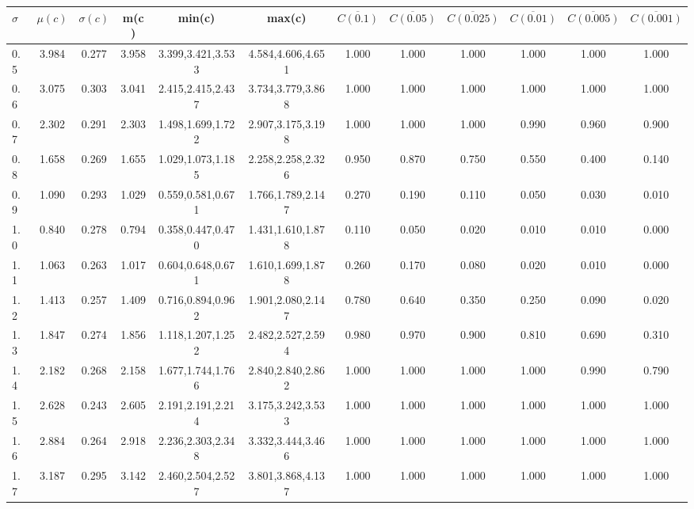 \begin{table*}[h!]
\begin{center}
\begin{tabular}{| l | c | c | c | c | c | c | c | c | c | c | c |}\hline
$\sigma$ & $\mu(c)$ & $\sigma(c)$ & m(c) & min(c) & max(c) & $\overline{C(0.1)}$ & $\overline{C(0.05)}$ & $\overline{C(0.025)}$ & $\overline{C(0.01)}$ & $\overline{C(0.005)}$ & $\overline{C(0.001)}$ \\\hline
0.5 & 3.984 & 0.277 & 3.958 & 3.399,3.421,3.533 & 4.584,4.606,4.651  & 1.000  & 1.000  & 1.000  & 1.000  & 1.000  & 1.000 \\\hline
0.6 & 3.075 & 0.303 & 3.041 & 2.415,2.415,2.437 & 3.734,3.779,3.868  & 1.000  & 1.000  & 1.000  & 1.000  & 1.000  & 1.000 \\\hline
0.7 & 2.302 & 0.291 & 2.303 & 1.498,1.699,1.722 & 2.907,3.175,3.198  & 1.000  & 1.000  & 1.000  & 0.990  & 0.960  & 0.900 \\\hline
0.8 & 1.658 & 0.269 & 1.655 & 1.029,1.073,1.185 & 2.258,2.258,2.326  & 0.950  & 0.870  & 0.750  & 0.550  & 0.400  & 0.140 \\\hline
0.9 & 1.090 & 0.293 & 1.029 & 0.559,0.581,0.671 & 1.766,1.789,2.147  & 0.270  & 0.190  & 0.110  & 0.050  & 0.030  & 0.010 \\\hline
1.0 & 0.840 & 0.278 & 0.794 & 0.358,0.447,0.470 & 1.431,1.610,1.878  & 0.110  & 0.050  & 0.020  & 0.010  & 0.010  & 0.000 \\\hline
1.1 & 1.063 & 0.263 & 1.017 & 0.604,0.648,0.671 & 1.610,1.699,1.878  & 0.260  & 0.170  & 0.080  & 0.020  & 0.010  & 0.000 \\\hline
1.2 & 1.413 & 0.257 & 1.409 & 0.716,0.894,0.962 & 1.901,2.080,2.147  & 0.780  & 0.640  & 0.350  & 0.250  & 0.090  & 0.020 \\\hline
1.3 & 1.847 & 0.274 & 1.856 & 1.118,1.207,1.252 & 2.482,2.527,2.594  & 0.980  & 0.970  & 0.900  & 0.810  & 0.690  & 0.310 \\\hline
1.4 & 2.182 & 0.268 & 2.158 & 1.677,1.744,1.766 & 2.840,2.840,2.862  & 1.000  & 1.000  & 1.000  & 1.000  & 0.990  & 0.790 \\\hline
1.5 & 2.628 & 0.243 & 2.605 & 2.191,2.191,2.214 & 3.175,3.242,3.533  & 1.000  & 1.000  & 1.000  & 1.000  & 1.000  & 1.000 \\\hline
1.6 & 2.884 & 0.264 & 2.918 & 2.236,2.303,2.348 & 3.332,3.444,3.466  & 1.000  & 1.000  & 1.000  & 1.000  & 1.000  & 1.000 \\\hline
1.7 & 3.187 & 0.295 & 3.142 & 2.460,2.504,2.527 & 3.801,3.868,4.137  & 1.000  & 1.000  & 1.000  & 1.000  & 1.000  & 1.000 \\\hline

\end{tabular}
\end{center}
\end{table*}
